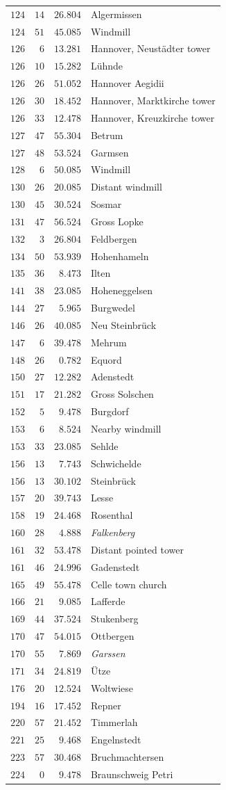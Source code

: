 \begin{longtable}{@{}rrrp{.61\linewidth}@{}}
\(124\)&\(14\)&\(26.804\)&\raggedright Algermissen\tabularnewline
\(124\)&\(51\)&\(45.085\)&\raggedright Windmill\tabularnewline
\(126\)&\(6\)&\(13.281\)&\raggedright Hannover, Neustädter tower\tabularnewline
\(126\)&\(10\)&\(15.282\)&\raggedright Lühnde\tabularnewline
\(126\)&\(26\)&\(51.052\)&\raggedright Hannover Aegidii\tabularnewline
\(126\)&\(30\)&\(18.452\)&\raggedright Hannover, Marktkirche tower\tabularnewline
\(126\)&\(33\)&\(12.478\)&\raggedright Hannover, Kreuzkirche tower\tabularnewline
\(127\)&\(47\)&\(55.304\)&\raggedright Betrum\tabularnewline
\(127\)&\(48\)&\(53.524\)&\raggedright Garmsen\tabularnewline
\(128\)&\(6\)&\(50.085\)&\raggedright Windmill\tabularnewline
\(130\)&\(26\)&\(20.085\)&\raggedright Distant windmill\tabularnewline
\(130\)&\(45\)&\(30.524\)&\raggedright Sosmar\tabularnewline
\(131\)&\(47\)&\(56.524\)&\raggedright Gross Lopke\tabularnewline
\(132\)&\(3\)&\(26.804\)&\raggedright Feldbergen\tabularnewline
\(134\)&\(50\)&\(53.939\)&\raggedright Hohenhameln\tabularnewline
\(135\)&\(36\)&\(8.473\)&\raggedright Ilten\tabularnewline
\(141\)&\(38\)&\(23.085\)&\raggedright Hoheneggelsen\tabularnewline
\(144\)&\(27\)&\(5.965\)&\raggedright Burgwedel\tabularnewline
\(146\)&\(26\)&\(40.085\)&\raggedright Neu Steinbrück\tabularnewline
\(147\)&\(6\)&\(39.478\)&\raggedright Mehrum\tabularnewline
\(148\)&\(26\)&\(0.782\)&\raggedright Equord\tabularnewline
\(150\)&\(27\)&\(12.282\)&\raggedright Adenstedt\tabularnewline
\(151\)&\(17\)&\(21.282\)&\raggedright Gross Solschen\tabularnewline
\(152\)&\(5\)&\(9.478\)&\raggedright Burgdorf\tabularnewline
\(153\)&\(6\)&\(8.524\)&\raggedright Nearby windmill\tabularnewline
\(153\)&\(33\)&\(23.085\)&\raggedright Sehlde\tabularnewline
\(156\)&\(13\)&\(7.743\)&\raggedright Schwichelde\tabularnewline
\(156\)&\(13\)&\(30.102\)&\raggedright Steinbrück\tabularnewline
\(157\)&\(20\)&\(39.743\)&\raggedright Lesse\tabularnewline
\(158\)&\(19\)&\(24.468\)&\raggedright Rosenthal\tabularnewline
\(160\)&\(28\)&\(4.888\)&\raggedright \textit{Falkenberg}\tabularnewline
\(161\)&\(32\)&\(53.478\)&\raggedright Distant pointed tower\tabularnewline
\(161\)&\(46\)&\(24.996\)&\raggedright Gadenstedt\tabularnewline
\(165\)&\(49\)&\(55.478\)&\raggedright Celle town church\tabularnewline
\(166\)&\(21\)&\(9.085\)&\raggedright Lafferde\tabularnewline
\(169\)&\(44\)&\(37.524\)&\raggedright Stukenberg\tabularnewline
\(170\)&\(47\)&\(54.015\)&\raggedright Ottbergen\tabularnewline
\(170\)&\(55\)&\(7.869\)&\raggedright \textit{Garssen}\tabularnewline
\(171\)&\(34\)&\(24.819\)&\raggedright Ütze\tabularnewline
\(176\)&\(20\)&\(12.524\)&\raggedright Woltwiese\tabularnewline
\(194\)&\(16\)&\(17.452\)&\raggedright Repner\tabularnewline
\(220\)&\(57\)&\(21.452\)&\raggedright Timmerlah\tabularnewline
\(221\)&\(25\)&\(9.468\)&\raggedright Engelnstedt\tabularnewline
\(223\)&\(57\)&\(30.468\)&\raggedright Bruchmachtersen\tabularnewline
\(224\)&\(0\)&\(9.478\)&\raggedright Braunschweig Petri\tabularnewline
\end{longtable}
\endgroup
